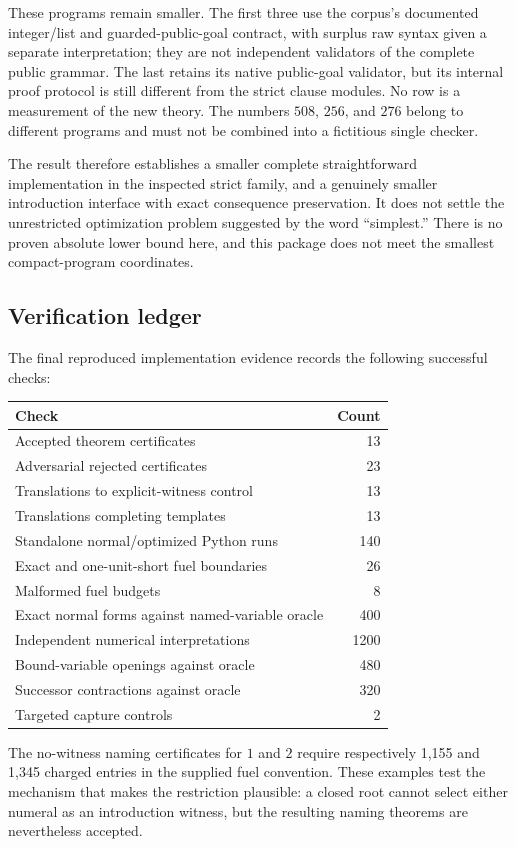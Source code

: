 These programs remain smaller. The first three use the corpus's documented
integer/list and guarded-public-goal contract, with surplus raw syntax
given a separate interpretation; they are not independent validators of
the complete public grammar. The last retains its native public-goal
validator, but its internal proof protocol is still different from the
strict clause modules. No row is a measurement of the new theory.
The numbers $508$, $256$, and $276$ belong to different programs and
must not be combined into a fictitious single checker.

The result therefore establishes a smaller complete straightforward
implementation in the inspected strict family, and a genuinely smaller
introduction interface with exact consequence preservation. It does not
settle the unrestricted optimization problem suggested by the word
``simplest.'' There is no proven absolute lower bound here, and this
package does not meet the smallest compact-program coordinates.

\subsection{Verification ledger}

The final reproduced implementation evidence records the following
successful checks:
\begin{center}
\begin{tabular}{lr}
\toprule
Check & Count\\
\midrule
Accepted theorem certificates &13\\
Adversarial rejected certificates &23\\
Translations to explicit-witness control &13\\
Translations completing templates &13\\
Standalone normal/optimized Python runs &140\\
Exact and one-unit-short fuel boundaries &26\\
Malformed fuel budgets &8\\
Exact normal forms against named-variable oracle &400\\
Independent numerical interpretations &1200\\
Bound-variable openings against oracle &480\\
Successor contractions against oracle &320\\
Targeted capture controls &2\\
\bottomrule
\end{tabular}
\end{center}
The no-witness naming certificates for $1$ and $2$ require respectively
1,155 and 1,345 charged entries in the supplied fuel convention. These
examples test the mechanism that makes the restriction plausible: a
closed root cannot select either numeral as an introduction witness,
but the resulting naming theorems are nevertheless accepted.

